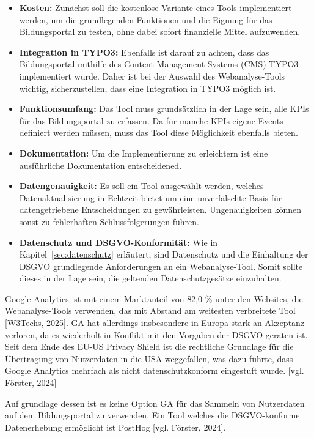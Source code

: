 \begin{itemize}
    \item \textbf{Kosten:} Zunächst soll die kostenlose Variante eines Tools implementiert werden, um die grundlegenden Funktionen und die Eignung für das Bildungsportal zu testen, ohne dabei sofort finanzielle Mittel aufzuwenden.
    \item \textbf{Integration in TYPO3:} Ebenfalls ist darauf zu achten, dass das Bildungsportal mithilfe des Content-Management-Systems (CMS) TYPO3 implementiert wurde. Daher ist bei der Auswahl des Webanalyse-Tools wichtig, sicherzustellen, dass eine Integration in TYPO3 möglich ist.
    \item \textbf{Funktionsumfang:} Das Tool muss grundsätzlich in der Lage sein, alle KPIs für das Bildungsportal zu erfassen. Da für manche KPIs eigene Events definiert werden müssen, muss das Tool diese Möglichkeit ebenfalls bieten. 
    \item \textbf{Dokumentation:} Um die Implementierung zu erleichtern ist eine ausführliche Dokumentation entscheidened.
    \item \textbf{Datengenauigkeit:} Es soll ein Tool ausgewählt werden, welches Datenaktualisierung in Echtzeit bietet um eine unverfälschte Basis für datengetriebene Entscheidungen zu gewährleisten. Ungenauigkeiten können sonst zu fehlerhaften Schlussfolgerungen führen.
    \item \textbf{Datenschutz und DSGVO-Konformität:} Wie in Kapitel~\ref{sec:datenschutz} erläutert, sind Datenschutz und die Einhaltung der DSGVO grundlegende Anforderungen an ein Webanalyse-Tool. Somit sollte dieses in der Lage sein, die geltenden Datenschutzgesätze einzuhalten.
\end{itemize}

Google Analytics ist mit einem Marktanteil von 82,0 \% unter den Websites, die Webanalyse-Tools verwenden, das mit Abstand am weitesten verbreitete Tool [W3Techs, 2025]. GA hat allerdings insbesondere in Europa stark an Akzeptanz verloren, da es wiederholt in Konflikt mit den Vorgaben der DSGVO geraten ist. Seit dem Ende des EU-US Privacy Shield ist die rechtliche Grundlage für die Übertragung von Nutzerdaten in die USA weggefallen, was dazu führte, dass Google Analytics mehrfach als nicht datenschutzkonform eingestuft wurde. [vgl. Förster, 2024]

Auf grundlage dessen ist es keine Option GA für das Sammeln von Nutzerdaten auf dem Bildungsportal zu verwenden. Ein Tool welches die DSGVO-konforme Datenerhebung ermöglicht ist PostHog [vgl. Förster, 2024]. 
